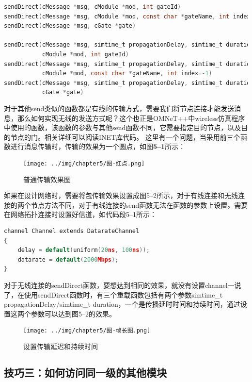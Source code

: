 \begin{lstlisting}[language=c,caption=My]
sendDirect(cMessage *msg, cModule *mod, int gateId)
sendDirect(cMessage *msg, cModule *mod, const char *gateName, int index=-1)
sendDirect(cMessage *msg, cGate *gate)

sendDirect(cMessage *msg, simtime_t propagationDelay, simtime_t duration,
           cModule *mod, int gateId)
sendDirect(cMessage *msg, simtime_t propagationDelay, simtime_t duration,
           cModule *mod, const char *gateName, int index=-1)
sendDirect(cMessage *msg, simtime_t propagationDelay, simtime_t duration,
           cGate *gate)

\end{lstlisting}

对于其他send类似的函数都是有线的传输方式，需要我们将节点连接才能发送消息，那么如何实现无线的发送方式呢？这个也正是OMNeT++中wireless仿真程序中使用的函数，该函数的参数与其他send函数不同，它需要指定目的节点，以及目的节点的门。相关详细可以阅读INET库代码。
这里有一个问题，当采用前三个函数进行消息传输时，传输的效果为一个圆点，如图\textbf{5--1}所示：

\begin{figure}[htbp]
\centering
\texttt{[image: ../img/chapter5/图-红点.png]}
\caption{普通传输效果图}
\end{figure}

如果在设计网络时，需要将包传输效果设置成图5--2所示，对于有线连接和无线连接的两个节点方法不同，对于有线连接的send函数无法在函数的参数上设置。需要在网络拓扑连接时设置好信道，如代码段5--1所示：

\begin{lstlisting}[language=c]
channel Channel extends DatarateChannel
{
    delay = default(uniform(20ns, 100ns));
    datarate = default(2000Mbps);
}

\end{lstlisting}

对于无线连接的sendDirect函数，要想达到相同的效果，就没有设置channel一说了，在使用sendDirect函数时，有三个重载函数包括有两个参数simtime\_t propagationDelay\slash simtime\_t duration，一个是传播延时时间和持续时间，通过设置这两个参数可以达到图5--2的效果。

\begin{figure}[htbp]
\centering
\texttt{[image: ../img/chapter5/图-帧长图.png]}
\caption{设置传输延迟和持续时间}
\end{figure}

\subsection{技巧三：如何访问同一级的其他模块}
\label{技巧三：如何访问同一级的其他模块}

